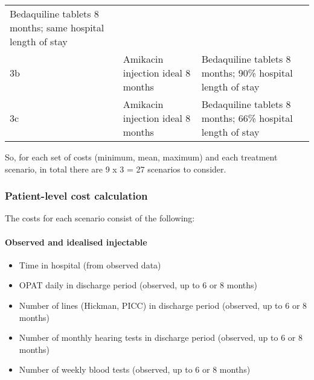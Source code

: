 \documentclass[]{article}
\providecommand{\tightlist}{%
  \setlength{\itemsep}{0pt}\setlength{\parskip}{0pt}}
\let\oldparagraph\paragraph
\renewcommand{\paragraph}[1]{\oldparagraph{#1}\mbox{}}
\begin{document}
\begin{longtable}[]{@{}lll@{}}
\begin{minipage}[t]{0.41\columnwidth}
Bedaquiline tablets 8 months; same hospital length of stay\strut
\end{minipage}\tabularnewline
\begin{minipage}[t]{0.08\columnwidth}\raggedright
3b\strut
\end{minipage} & \begin{minipage}[t]{0.41\columnwidth}\raggedright
Amikacin injection ideal 8 months\strut
\end{minipage} & \begin{minipage}[t]{0.41\columnwidth}\raggedright
Bedaquiline tablets 8 months; 90\% hospital length of stay\strut
\end{minipage}\tabularnewline
\begin{minipage}[t]{0.08\columnwidth}\raggedright
3c\strut
\end{minipage} & \begin{minipage}[t]{0.41\columnwidth}\raggedright
Amikacin injection ideal 8 months\strut
\end{minipage} & \begin{minipage}[t]{0.41\columnwidth}\raggedright
Bedaquiline tablets 8 months; 66\% hospital length of stay\strut
\end{minipage}\tabularnewline
\bottomrule
\end{longtable}

So, for each set of costs (minimum, mean, maximum) and each treatment
scenario, in total there are 9 x 3 = 27 scenarios to consider.

\hypertarget{patient-level-cost-calculation}{%
\subsubsection{Patient-level cost
calculation}\label{patient-level-cost-calculation}}

The costs for each scenario consist of the following:

\hypertarget{observed-and-idealised-injectable}{%
\paragraph{Observed and idealised
injectable}\label{observed-and-idealised-injectable}}

\begin{itemize}
\tightlist
\item
  Time in hospital (from observed data)
\item
  OPAT daily in discharge period (observed, up to 6 or 8 months)
\item
  Number of lines (Hickman, PICC) in discharge period (observed, up to 6
  or 8 months)
\item
  Number of monthly hearing tests in discharge period (observed, up to 6
  or 8 months)
\item
  Number of weekly blood tests (observed, up to 6 or 8 months)
\end{itemize}
\end{document}
